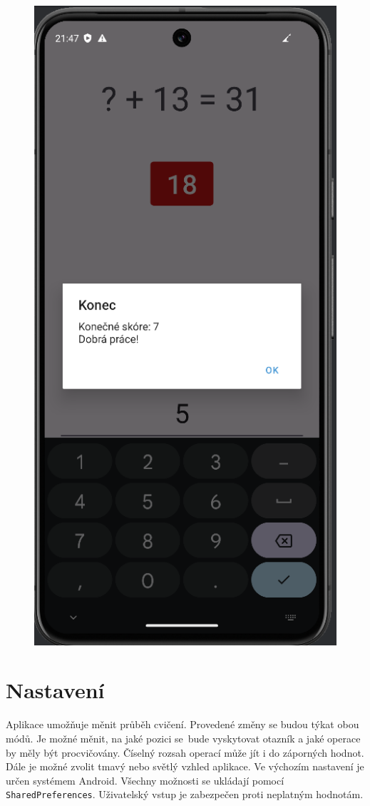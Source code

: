 \documentclass[12pt]{report}
\begin{document}
\begin{figure}[ht]
\begin{minipage}{.5\textwidth}
			\includegraphics[height=1.7\textwidth]{img/challenge_2}
			\label{fig:challenge_2}
		\end{minipage}
	\end{figure}
	
	\newpage
	\section{Nastavení}
	Aplikace umožňuje měnit průběh cvičení. Provedené změny se budou týkat obou módů. Je možné měnit, na jaké pozici se~bude vyskytovat otazník a jaké operace by měly být procvičovány. Číselný rozsah operací může jít i do záporných hodnot. Dále je možné zvolit tmavý nebo světlý vzhled aplikace. Ve výchozím nastavení je určen systémem Android. Všechny možnosti se ukládají pomocí \texttt{SharedPreferences}. Uživatelský vstup je zabezpečen proti neplatným hodnotám.
	
\end{document}
